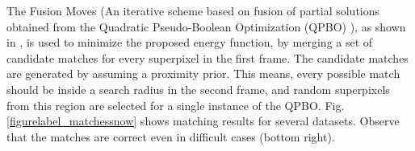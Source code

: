 
The Fusion Moves (An iterative scheme based on fusion of partial solutions obtained from the Quadratic Pseudo-Boolean Optimization (QPBO) \cite{c3,c4}), 
as shown in \cite{c7}, is used to minimize the proposed energy function, by merging a set of candidate matches for every superpixel in the first frame. 
The candidate matches are generated by assuming a proximity prior. 
This means, every possible match should be inside a search radius in the second frame, and random superpixels from this region are selected for a single instance of the QPBO. 
Fig. \ref{figurelabel_matchessnow} shows matching results for several datasets. Observe that the matches are correct even in difficult cases (bottom right).

